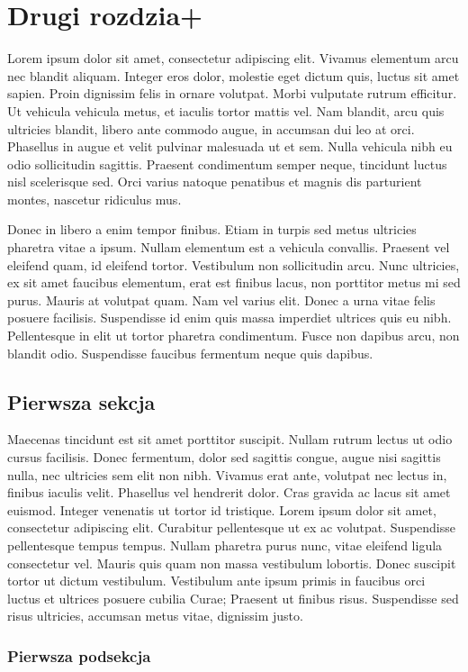 \chapter{Drugi rozdzia+}
Lorem ipsum dolor sit amet, consectetur adipiscing elit. Vivamus elementum arcu
nec blandit aliquam. Integer eros dolor, molestie eget dictum quis, luctus sit
amet sapien. Proin dignissim felis in ornare volutpat. Morbi vulputate rutrum
efficitur. Ut vehicula vehicula metus, et iaculis tortor mattis vel. Nam
blandit, arcu quis ultricies blandit, libero ante commodo augue, in accumsan dui
leo at orci. Phasellus in augue et velit pulvinar malesuada ut et sem. Nulla
vehicula nibh eu odio sollicitudin sagittis. Praesent condimentum semper neque,
tincidunt luctus nisl scelerisque sed. Orci varius natoque penatibus et magnis
dis parturient montes, nascetur ridiculus mus.

Donec in libero a enim tempor finibus. Etiam in turpis sed metus ultricies
pharetra vitae a ipsum. Nullam elementum est a vehicula convallis. Praesent vel
eleifend quam, id eleifend tortor. Vestibulum non sollicitudin arcu. Nunc
ultricies, ex sit amet faucibus elementum, erat est finibus lacus, non porttitor
metus mi sed purus. Mauris at volutpat quam. Nam vel varius elit. Donec a urna
vitae felis posuere facilisis. Suspendisse id enim quis massa imperdiet ultrices
quis eu nibh. Pellentesque in elit ut tortor pharetra condimentum. Fusce non
dapibus arcu, non blandit odio. Suspendisse faucibus fermentum neque quis
dapibus.
\section{Pierwsza sekcja}
Maecenas tincidunt est sit amet porttitor suscipit. Nullam rutrum lectus ut odio
cursus facilisis. Donec fermentum, dolor sed sagittis congue, augue nisi
sagittis nulla, nec ultricies sem elit non nibh. Vivamus erat ante, volutpat nec
lectus in, finibus iaculis velit. Phasellus vel hendrerit dolor. Cras gravida ac
lacus sit amet euismod. Integer venenatis ut tortor id tristique. Lorem ipsum
dolor sit amet, consectetur adipiscing elit. Curabitur pellentesque ut ex ac
volutpat. Suspendisse pellentesque tempus tempus. Nullam pharetra purus nunc,
vitae eleifend ligula consectetur vel. Mauris quis quam non massa vestibulum
lobortis. Donec suscipit tortor ut dictum vestibulum. Vestibulum ante ipsum
primis in faucibus orci luctus et ultrices posuere cubilia Curae; Praesent ut
finibus risus. Suspendisse sed risus ultricies, accumsan metus vitae, dignissim
justo.
\subsection{Pierwsza podsekcja}

